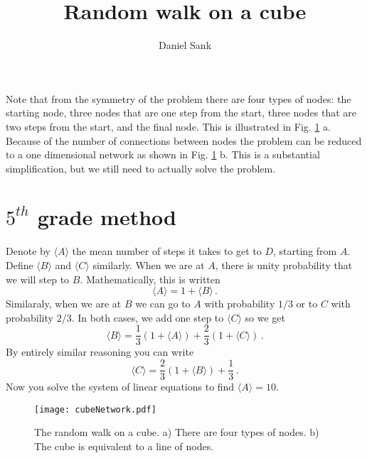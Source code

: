 \documentclass{article}
\begin{document}
\title{Random walk on a cube}
\author{Daniel Sank}

\maketitle

Note that from the symmetry of the problem there are four types of nodes: the starting node, three nodes that are one step from the start, three nodes that are two steps from the start, and the final node.
This is illustrated in Fig. \ref{Fig:cubeNetwork} a.
Because of the number of connections between nodes the problem can be reduced to a one dimensional network as shown in Fig. \ref{Fig:cubeNetwork} b.
This is a substantial simplification, but we still need to actually solve the problem.

\section{$5^{th}$ grade method}

Denote by $\langle A \rangle$ the mean number of steps it takes to get to $D$, starting from $A$. Define $\langle B \rangle$ and $\langle C \rangle$ similarly.
When we are at $A$, there is unity probability that we will step to $B$.
Mathematically, this is written
\begin{equation}
\langle A \rangle = 1 + \langle B \rangle \, .
\end{equation}
Similaraly, when we are at $B$ we can go to $A$ with probability $1/3$ or to $C$ with probability $2/3$.
In both cases, we add one step to $\langle C \rangle$ so we get
\begin{equation}
\langle B \rangle = \frac{1}{3}(1 + \langle A \rangle) + \frac{2}{3}(1 + \langle C \rangle) \, .
\end{equation}
By entirely similar reasoning you can write
\begin{equation}
\langle C \rangle = \frac{2}{3} (1 + \langle B \rangle) + \frac{1}{3} \, .
\end{equation}
Now you solve the system of linear equations to find $\langle A \rangle = 10$.

\begin{figure}
\begin{centering}
\texttt{[image: cubeNetwork.pdf]} 
\par\end{centering}
\caption{The random walk on a cube. a) There are four types of nodes. b) The cube is equivalent to a line of nodes.}
\label{Fig:cubeNetwork}
\end{figure}
\end{document}
